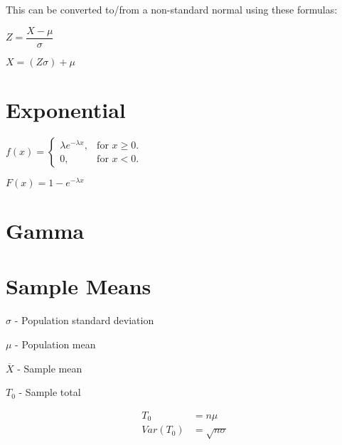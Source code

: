 \documentclass[12pt,fleqn]{article}
\begin{document}
This can be converted to/from a non-standard normal using these formulas:

$Z = \dfrac{X-\mu}{\sigma}$


$X = (Z \sigma) + \mu$


\section{Exponential}


$
f(x)=\begin{cases}
\lambda e^{-\lambda x}, & \text{for $x\ge0$}.\\
0, & \text{for $x<0$}.
\end{cases}
$

$ F(x)=1-e^{-\lambda x} $
\section{Gamma}


\section{Sample Means}

$\sigma$ - Population standard deviation

$\mu$ - Population mean

$\overline{X}$ - Sample mean

$T_0$ - Sample total

\begin{align*}
T_0 &= n\mu\\
Var(T_0) &= \sqrt{n\sigma}
\end{align*}
\end{document}
